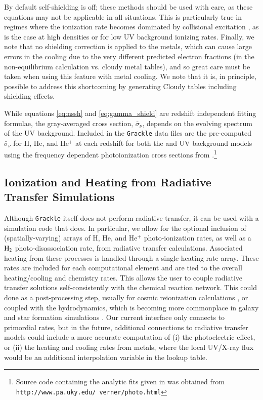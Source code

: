 By default self-shielding is off; these methods should be used with care, as these equations may not be applicable in all situations. This is particularly true in regimes where the ionization rate becomes dominated by collisional excitation \citep{2013MNRAS.430.2427R}, as is the case at high densities or for low UV background ionizing rates.  Finally, we note that no shielding correction is applied to the metals, which can cause large errors in the cooling due to the very different predicted electron fractions (in the non-equilibrium calculation vs. cloudy metal tables), and so great care must be taken when using this feature with metal cooling.  We note that it is, in principle, possible to address this shortcoming by generating Cloudy tables including shielding effects.

While equations \ref{eq:nssh} and \ref{eq:gamma_shield} are redshift independent fitting formulae, the gray-averaged cross section, $\bar{\sigma}_{\nu}$, depends on the evolving spectrum of the UV background. Included in the \texttt{Grackle} data files are the pre-computed $\bar{\sigma}_{\nu}$ for H, He, and He$^+$ at each redshift for both the \citet{2009ApJ...703.1416F} and \citet{2012ApJ...746..125H} UV background models using the frequency dependent photoionization cross sections from \citet{1996ApJ...465..487V}.\footnote{Source code containing the analytic fits given in \citet{1996ApJ...465..487V} was obtained from \texttt{http://www.pa.uky.edu/~verner/photo.html}}


\subsection{Ionization and Heating from Radiative Transfer Simulations}
\label{section:radiative-transfer}

Although \texttt{Grackle} itself does not perform radiative transfer, it can be used with a simulation code that does.  In particular, we allow for the optional inclusion of (spatially-varying) arrays of H, He, and He$^+$ photo-ionization rates, as well as a $\rm{H}_2$ photo-disassociation rate, from radiative transfer calculations. Associated heating from these processes is handled through a single heating rate array. These rates are included for each computational element and are tied to the overall heating/cooling and chemistry rates. This allows the user to couple radiative transfer solutions self-consistently with the chemical reaction network.  This could done as a post-processing step, usually for cosmic reionization calculations \citep[e.g.][]{2014MNRAS.439..725I, 2016MNRAS.459.2342M}, or coupled with the hydrodynamics, which is becoming more commonplace in galaxy and star formation simulations \citep[e.g.][]{2014MNRAS.442.2560W, 2015MNRAS.451...34R,  2015arXiv151100011O, 2015MNRAS.454..380B, 2016arXiv160300034P, 2016arXiv160703117R}.  Our current interface only connects to primordial rates, but in the future, additional connections to radiative transfer models could include a more accurate computation of (i) the photoelectric effect, or (ii) the heating and cooling rates from metals, where the local UV/X-ray flux would be an additional interpolation variable in the lookup table.

